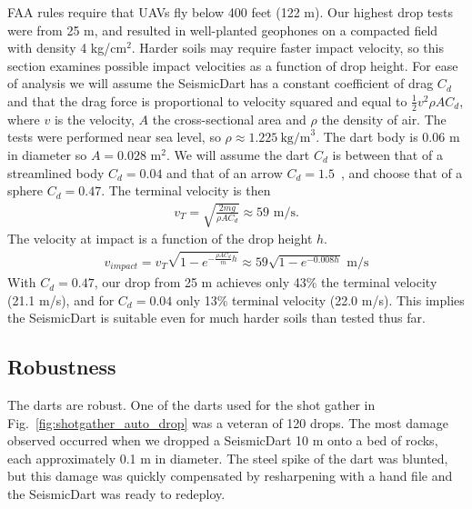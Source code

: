 FAA rules require that UAVs fly below 400 feet (122 m). Our highest drop tests were from 25 m, and resulted in well-planted geophones on a compacted field with density 4 kg/cm$^2$. Harder soils may require faster impact velocity, so this section examines possible impact velocities as a function of drop height.
For ease of analysis we will assume the SeismicDart has a constant coefficient of drag $C_d$ and that the drag force is proportional to velocity squared and equal to $\frac{1}{2} v^2 \rho A C_d$, where $v$ is the velocity, $A$ the cross-sectional area and $\rho$ the density of air.  
 The tests were performed near sea level, so $\rho \approx 1.225~\text{kg/m}^3$.
  The dart body is 0.06 m in diameter so $A=0.028$ m$^2$.  We will assume the dart $C_d$ is between that of a streamlined body $C_d=0.04$ and that of an arrow $C_d=1.5$~\cite{miyazaki2013aerodynamic}, and choose that of a sphere $C_d=0.47$.
The terminal velocity is then
\begin{align}
v_T = \sqrt{\frac{2 m g}{\rho A  C_d}} \approx 59 \text{ m/s.}
\end{align}
The velocity at impact is a function of the drop height $h$.
\begin{align}
v_{impact} = v_T  \sqrt{ 1 - e^{ -\frac{\rho A  C_d}{m} h }} \approx 59\sqrt{ 1 - e^{ -0.008 h }} \text{ m/s}
\end{align}
With  $C_d=0.47$, our drop from 25 m achieves only 43\% the terminal velocity (21.1 m/s), and for $C_d=0.04$ only 13\% terminal velocity  (22.0 m/s).
This implies the SeismicDart is suitable even for much harder soils than tested thus far.

\subsection{Robustness}
  The darts are robust. One of the darts used for the shot gather in Fig.~\ref{fig:shotgather_auto_drop} was a veteran of 120 drops.
The most damage observed occurred when we dropped a SeismicDart 10 m onto a bed of  rocks, each approximately  0.1 m in diameter. The steel spike of the dart was blunted, but this damage was quickly compensated by resharpening with a hand file and the SeismicDart was ready to redeploy.







